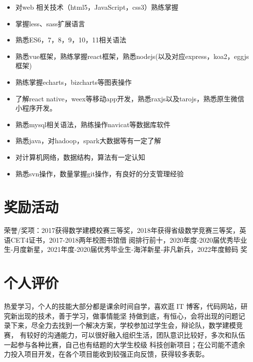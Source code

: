 \documentclass{mycv}
\begin{document}
\begin{itemize}
      \item 对web 相关技术（html5，JavaScript，css3）熟练掌握
      \item 掌握less、sass扩展语言
      \item 熟悉ES6，7，8，9，10，11相关语法
      \item 熟悉vue框架，熟练掌握react框架，熟悉nodejs(以及对应express，koa2，eggjs 框架)
      \item 熟练掌握echarts，bizcharts等图表操作      
      \item 了解react native，weex等移动app开发，熟悉raxjs以及tarojs，熟悉原生微信小程序开发。
      \item 熟悉mysql相关语法，熟练操作navicat等数据库软件
      \item 熟悉java，对hadoop，spark大数据等有一定了解
      \item 对计算机网络，数据结构，算法有一定认知
      \item 熟悉svn操作，数量掌握git操作，有良好的分支管理经验
\end{itemize}



\section{奖励活动}

荣誉/奖项：2017获得数学建模校赛三等奖，2018年获得省级数学竞赛三等奖，英语CET4证书，2017-2018两年校图书馆借
阅排行前十，2020年度-2020届优秀毕业生-月度新星，2021年度-2020届优秀毕业生-海洋新星-非凡新兵，2022年度鲸码
奖

\section{个人评价}

热爱学习，个人的技能大部分都是课余时间自学，喜欢逛IT 博客，代码网站，研究新出现的技术，善于学习，做事情能坚
持做到底，有恒心，会将出现的问题记录下来，尽全力去找到一个解决方案，学校参加过学生会，辩论队，数学建模竞赛，
有较好的沟通能力，可以很好融入组织生活，团队意识比较好，多次和队伍一起参与各种比赛，自己也有结题的大学生校级
科技创新项目；在公司能不遗余力投入项目开发，在各个项目能收到较强正向反馈，获得较多表彰。

\end{document}
